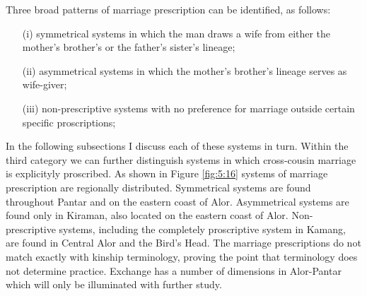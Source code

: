 Three broad patterns of marriage prescription can be identified, as follows: 
\begin{enumerate}
\item[(i)] symmetrical systems in which the man draws a wife from either the mother's brother's or the father's sister's lineage; 
\item[(ii)] asymmetrical systems in which the mother's brother's lineage serves as wife-giver; 
\item[(iii)] non-prescriptive systems with no preference for marriage outside certain specific proscriptions;
\end{enumerate}

In the following subsections I discuss each of these systems in turn. Within the third category we can further distinguish systems in which cross-cousin marriage is explicityly proscribed. As shown in Figure \ref{fig:5:16} systems of marriage prescription are regionally distributed. Symmetrical systems are found throughout Pantar and on the eastern coast of Alor. Asymmetrical systems are found only in Kiraman, also located on the eastern coast of Alor. Non-prescriptive systems, including the completely proscriptive system in Kamang, are found in Central Alor and the Bird's Head. The marriage prescriptions do not match exactly with kinship terminology, proving the point that  terminology does not determine practice. Exchange has a number of dimensions in Alor-Pantar which will only be illuminated with further study.

